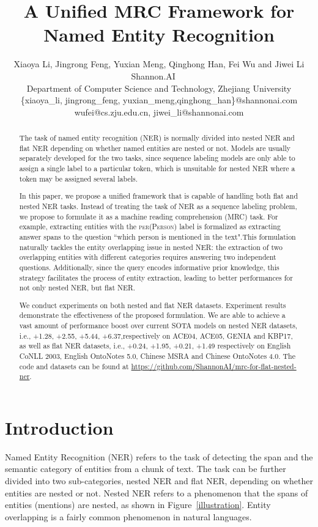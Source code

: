 \documentclass[11pt,a4paper]{article}
\title{A Unified MRC Framework for Named Entity Recognition}
\author{Xiaoya Li, Jingrong Feng, Yuxian Meng, Qinghong Han, Fei Wu and Jiwei Li  \\
 Shannon.AI  ~~\\
 Department of Computer Science and Technology, Zhejiang University\\
  \{xiaoya\_li, jingrong\_feng, yuxian\_meng,qinghong\_han\}@shannonai.com\\
   wufei@cs.zju.edu.cn,  jiwei\_li@shannonai.com
}
\date{}
\begin{document}
\maketitle

\begin{abstract}
The task of named entity recognition (NER)  is normally divided into nested NER and flat NER depending  on whether named entities are nested or not. Models are usually separately developed for the two tasks, since   sequence labeling models are only able to assign a single label to a particular token, which is unsuitable for nested NER where a token may be assigned several labels.

In this paper, we propose a unified framework  that is capable of handling both flat and nested NER tasks. Instead of treating the task of NER as a sequence labeling problem, we propose to formulate it as a machine reading comprehension (MRC) task. For example, extracting entities with the \textsc{per(Person)} label is formalized as extracting answer spans to the question  ``which person is mentioned in the text".This formulation naturally  tackles the entity overlapping issue in nested NER: the extraction of two overlapping entities with different categories requires answering two independent questions. Additionally, since the query encodes informative prior knowledge, this strategy facilitates the process of entity extraction, leading to better performances for not only nested NER, but flat NER. 
 

We conduct experiments on both nested and flat NER datasets. Experiment results demonstrate  the effectiveness of the proposed formulation. We are able to achieve a vast amount of performance boost over current SOTA models on nested NER datasets, i.e.,   +1.28, +2.55, +5.44, +6.37,respectively on ACE04, ACE05, GENIA and KBP17, as well as flat NER datasets, i.e., +0.24, +1.95, +0.21, +1.49 respectively on English CoNLL 2003, English OntoNotes 5.0, Chinese MSRA and Chinese OntoNotes 4.0. The code and datasets can be found at \url{ https://github.com/ShannonAI/mrc-for-flat-nested-ner}.



\end{abstract}

\section{Introduction}



Named Entity Recognition (NER)  refers to the task of detecting the span and the semantic category of entities from a chunk of text.
The task can be further divided into two sub-categories, nested NER and flat NER,  
depending  on whether entities are nested or not. 
Nested NER refers to a phenomenon that the spans of entities (mentions) are nested, 
as shown in Figure~\ref{illustration}. Entity overlapping is a fairly common phenomenon in natural languages.   
\end{document}
